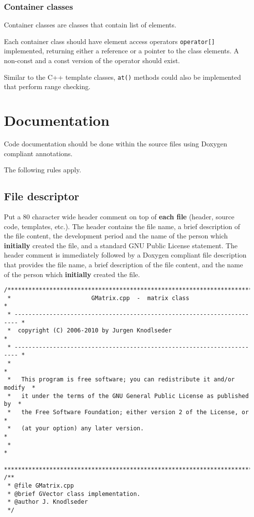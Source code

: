 \documentclass{article}[12pt,a4]
\begin{document}
\subsubsection{Container classes}

Container classes are classes that contain list of elements.

Each container class should have element access operators {\tt operator[]} implemented,
returning either a reference or a pointer to the class elements.
A non-const and a const version of the operator should exist.

Similar to the C++ template classes, {\tt at()} methods could also be implemented that
perform range checking.


\section{Documentation}

Code documentation should be done within the source files using Doxygen
compliant annotations.

The following rules apply.


\subsection{File descriptor}

Put a 80 character wide header comment on top of {\bf each file}
(header, source code, templates, etc.).
The header contains
the file name,
a brief description of the file content,
the development period and the name of the person which {\bf initially}
created the file, and
a standard GNU Public License statement.
The header comment is immediately followed by a Doxygen compliant
file description that provides
the file name,
a brief description of the file content, and
the name of the person which {\bf initially} created the file.
\begin{verbatim}
/***************************************************************************
 *                       GMatrix.cpp  -  matrix class                      *
 * ----------------------------------------------------------------------- *
 *  copyright (C) 2006-2010 by Jurgen Knodlseder                           *
 * ----------------------------------------------------------------------- *
 *                                                                         *
 *   This program is free software; you can redistribute it and/or modify  *
 *   it under the terms of the GNU General Public License as published by  *
 *   the Free Software Foundation; either version 2 of the License, or     *
 *   (at your option) any later version.                                   *
 *                                                                         *
 ***************************************************************************/
/**
 * @file GMatrix.cpp
 * @brief GVector class implementation.
 * @author J. Knodlseder
 */
\end{verbatim}
\end{document}

